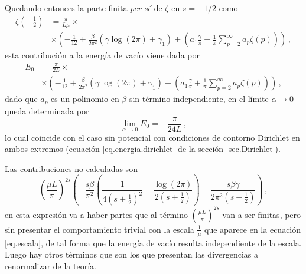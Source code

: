 Quedando entonces la parte finita {\it per sé}  de $\zeta$ en $s=-1/2$ como
\begin{align}\label{eq.escala}
 \zeta \left( -\frac{1}{2} \right) &= \frac{\pi}{L \mu} \times \\
 					& \times
					\left(
							- \frac{1}{12} +
							\frac{\beta}{2 \pi ^2} \left(
														\gamma \log (2 \pi)
														+ \gamma _1
														\right) +
							\left(
								a _1 \frac{\gamma}{\pi} +
								\frac{1}{\pi} \sum _{p=2} ^{\infty}
								a_p \zeta (p) 
								\right)
							\right) 
							\, ,
\end{align}
esta contribución a la energía de vacío viene dada por 
\begin{align}
 E _0 &= \frac{\pi}{2 L } \times \\
 					& \times
					\left(
							- \frac{1}{12} +
							\frac{\beta}{2 \pi ^2} \left(
														\gamma \log (2 \pi)
														+ \gamma _1
														\right) +
							\left(
							a _1\frac{\gamma}{\pi}
							+ \frac{1}{\pi} \sum _{p=2} ^{\infty}
								a_p \zeta (p) 
								\right)
							\right) 
							\, ,
\end{align}
dado que $a _p$ es un polinomio en $\beta$ sin término independiente, en el límite $\alpha \rightarrow 0$ queda determinada por
\begin{equation}
\lim \limits_{\alpha \rightarrow 0} E _0 = 
		- \frac{\pi}{24 L}
\, ,
\end{equation}
lo cual coincide con el caso sin potencial con condiciones de contorno Dirichlet en ambos extremos (ecuación \ref{eq.energia.dirichlet} de la sección \ref{sec.Dirichlet}).


Las contribuciones no calculadas son
\begin{equation}
\left(
		\frac{\mu L}{\pi}
		\right) ^{2s}
\left(
		-\frac{s \beta}{\pi ^2}
			\left(
				\frac{1}{4 \left( s + \frac{1}{2}\right) ^2} +
				\frac{\log (2 \pi )}{2 \left( s + \frac{1}{2}\right)}
				\right)	-
				\frac{s \beta \gamma}{2 \pi ^2 \left( s + \frac{1}{2} \right) }
		\right)
\, ,
\end{equation}
en esta expresión va a haber partes que al término $ \left( \frac{\mu L}{\pi}\right) ^{2s}$ van a ser finitas, pero sin presentar el comportamiento trivial con la escala $\frac{1}{\mu}$ que aparece en la ecuación \ref{eq.escala}, de tal forma que la energía de vacío resulta independiente de la escala. Luego hay otros términos que son los que presentan las divergencias a renormalizar de la teoría. 

